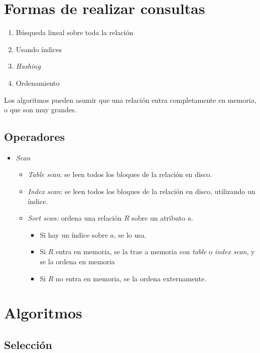 \documentclass[a4paper, twoside]{article}
\begin{document}
\section{Formas de realizar consultas}
\begin{enumerate}
\item Búsqueda lineal sobre toda la relación
\item Usando índices
\item \emph{Hashing}
\item Ordenamiento
\end{enumerate}
Los algoritmos pueden asumir que una relación entra completamente
en memoria, o que son muy grandes.


\subsection{Operadores}
\begin{itemize}
\item \emph{Scan}

\begin{itemize}
\item \emph{Table scan}: se leen todos los bloques de la relación en disco.
\item \emph{Index scan}: se leen todos los bloques de la relación en disco,
utilizando un índice.
\item \emph{Sort scan:} ordena una relación $R$ sobre un atributo $a$.

\begin{itemize}
\item Si hay un índice sobre $a$, se lo usa.
\item Si $R$ entra en memoria, se la trae a memoria con \emph{table} o
\emph{index scan}, y se la ordena en memoria
\item Si $R$ no entra en memoria, se la ordena externamente.
\end{itemize}
\end{itemize}
\end{itemize}

\section{Algoritmos}


\subsection{Selección}
\end{document}

